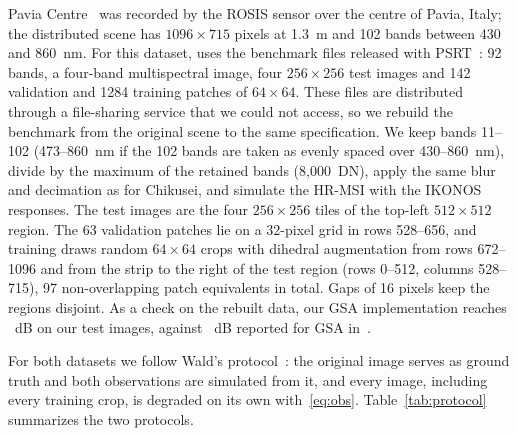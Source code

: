 \documentclass[journal]{IEEEtran}
\begin{document}
Pavia Centre~\cite{gamba2004pavia} was recorded by the ROSIS sensor over the centre of Pavia, Italy; the distributed scene has $1096\times715$ pixels at 1.3~m and 102 bands between 430 and 860~nm. For this dataset, \cite{chen2026twostage} uses the benchmark files released with PSRT~\cite{deng2023psrt}: 92 bands, a four-band multispectral image, four $256\times256$ test images and 142 validation and 1284 training patches of $64\times64$. These files are distributed through a file-sharing service that we could not access, so we rebuild the benchmark from the original scene to the same specification. We keep bands 11--102 (473--860~nm if the 102 bands are taken as evenly spaced over 430--860~nm), divide by the maximum of the retained bands (8{,}000~DN), apply the same blur and decimation as for Chikusei, and simulate the HR-MSI with the IKONOS responses. The test images are the four $256\times256$ tiles of the top-left $512\times512$ region. The 63 validation patches lie on a 32-pixel grid in rows 528--656, and training draws random $64\times64$ crops with dihedral augmentation from rows 672--1096 and from the strip to the right of the test region (rows 0--512, columns 528--715), 97 non-overlapping patch equivalents in total. Gaps of 16 pixels keep the regions disjoint. As a check on the rebuilt data, our GSA implementation reaches ~dB on our test images, against ~dB reported for GSA in~\cite{chen2026twostage}.

For both datasets we follow Wald's protocol~\cite{wald1997fusion}: the original image serves as ground truth and both observations are simulated from it, and every image, including every training crop, is degraded on its own with~\eqref{eq:obs}. Table~\ref{tab:protocol} summarizes the two protocols.
\end{document}
